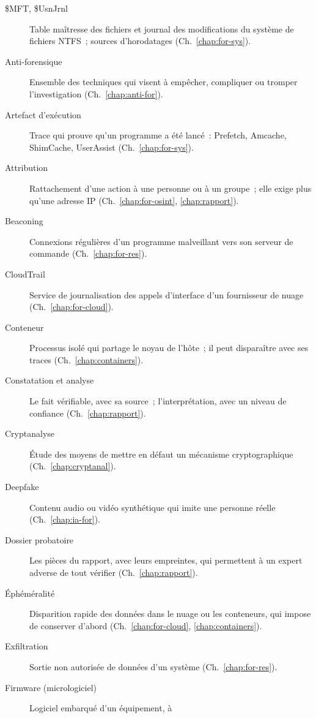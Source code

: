 \begin{description}
    \item[\$MFT, \$UsnJrnl] Table maîtresse des fichiers et journal des
          modifications du système de fichiers NTFS~; sources d'horodatages
          (Ch.~\ref{chap:for-sys}).
    \item[Anti-forensique] Ensemble des techniques qui visent à empêcher,
          compliquer ou tromper l'investigation (Ch.~\ref{chap:anti-for}).
    \item[Artefact d'exécution] Trace qui prouve qu'un programme a été lancé~:
          Prefetch, Amcache, ShimCache, UserAssist (Ch.~\ref{chap:for-sys}).
    \item[Attribution] Rattachement d'une action à une personne ou à un
          groupe~; elle exige plus qu'une adresse IP (Ch.~\ref{chap:for-osint},
          \ref{chap:rapport}).
    \item[Beaconing] Connexions régulières d'un programme malveillant vers son
          serveur de commande (Ch.~\ref{chap:for-res}).
    \item[CloudTrail] Service de journalisation des appels d'interface d'un
          fournisseur de nuage (Ch.~\ref{chap:for-cloud}).
    \item[Conteneur] Processus isolé qui partage le noyau de l'hôte~; il peut
          disparaître avec ses traces (Ch.~\ref{chap:containers}).
    \item[Constatation et analyse] Le fait vérifiable, avec sa source~;
          l'interprétation, avec un niveau de confiance (Ch.~\ref{chap:rapport}).
    \item[Cryptanalyse] Étude des moyens de mettre en défaut un mécanisme
          cryptographique (Ch.~\ref{chap:cryptanal}).
    \item[Deepfake] Contenu audio ou vidéo synthétique qui imite une personne
          réelle (Ch.~\ref{chap:ia-for}).
    \item[Dossier probatoire] Les pièces du rapport, avec leurs empreintes,
          qui permettent à un expert adverse de tout vérifier
          (Ch.~\ref{chap:rapport}).
    \item[Éphéméralité] Disparition rapide des données dans le nuage ou les
          conteneurs, qui impose de conserver d'abord (Ch.~\ref{chap:for-cloud},
          \ref{chap:containers}).
    \item[Exfiltration] Sortie non autorisée de données d'un système
          (Ch.~\ref{chap:for-res}).
    \item[Firmware (micrologiciel)] Logiciel embarqué d'un équipement, à

\end{description}
